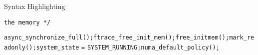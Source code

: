 \begin{frame}{Syntax Highlighting}
\begin{verbatim}
the memory */\end{verbatim}\leavevmode\newline\tab\color{Aquamarine}\verb$async_synchronize_full$\color{Fuchsia}\verb$($\color{Fuchsia}\verb$)$\color{Fuchsia}\verb$;$\newline\tab\color{Aquamarine}\verb$ftrace_free_init_mem$\color{Fuchsia}\verb$($\color{Fuchsia}\verb$)$\color{Fuchsia}\verb$;$\newline\tab\color{Aquamarine}\verb$free_initmem$\color{Fuchsia}\verb$($\color{Fuchsia}\verb$)$\color{Fuchsia}\verb$;$\newline\tab\color{Aquamarine}\verb$mark_readonly$\color{Fuchsia}\verb$($\color{Fuchsia}\verb$)$\color{Fuchsia}\verb$;$\newline\tab\color{Aquamarine}\verb$system_state$ \color{Fuchsia}\verb$=$ \color{Aquamarine}\verb$SYSTEM_RUNNING$\color{Fuchsia}\verb$;$\newline\tab\color{Aquamarine}\verb$numa_default_policy$\color{Fuchsia}\verb$($\color{Fuchsia}\verb$)$\color{Fuchsia}\verb$;$
\end{frame}
